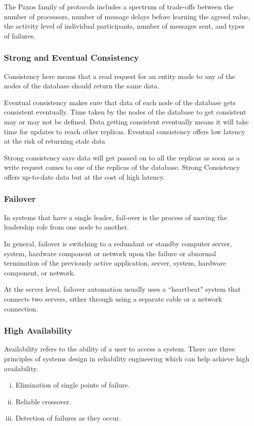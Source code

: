 \documentclass{article}
\begin{document}
    The Paxos family of protocols includes a spectrum of trade-offs between the number of processors, number of message delays before learning the agreed value, the activity level of individual participants, number of messages sent, and types of failures.
    
    \subsubsection{Strong and Eventual Consistency}
    Consistency here means that a read request for an entity made to any of the nodes of the database should return the same data. 
    
    Eventual consistency makes sure that data of each node of the database gets consistent eventually. Time taken by the nodes of the database to get consistent may or may not be defined. Data getting consistent eventually means it will take time for updates to reach other replicas. Eventual consistency offers low latency at the risk of returning stale data
    
    Strong consistency says data will get passed on to all the replicas as soon as a write request comes to one of the replicas of the database. Strong Consistency offers up-to-date data but at the cost of high latency.
    
    \subsubsection{Failover}
    In systems that have a single leader, fail-over is the process of moving the leadership role from one node to another.
    
    In general, failover is switching to a redundant or standby computer server, system, hardware component or network upon the failure or abnormal termination of the previously active application, server, system, hardware component, or network.
    
    At the server level, failover automation usually uses a ``heartbeat" system that connects two servers, either through using a separate cable or a network connection.
    
    \subsubsection{High Availability}
     Availability refers to the ability of a user to access a system. There are three principles of systems design in reliability engineering which can help achieve high availability.
    \begin{enumerate}[i.]
        \item Elimination of single points of failure. 
        \item Reliable crossover. 
        \item Detection of failures as they occur.
    \end{enumerate}
    
\end{document}
